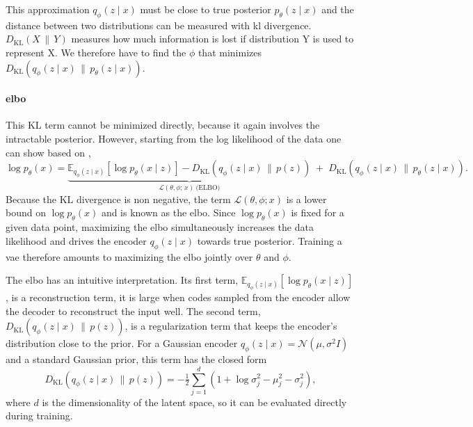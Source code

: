 \documentclass[
  numbers=noenddot,
  english,  %
  a4paper,  %
  twoside,  %
  bibliography=totoc,
  headsepline,
  cleardoublepage=empty,
  parskip=half,
  draft=false
]{scrbook}
\theoremstyle{break}
\begin{document}
This approximation $q_\phi(z \mid x)$ must be close to true posterior $p_\theta(z \mid x)$ and the distance between two distributions can be measured with \gls{kl} divergence. $D_{\mathrm{KL}} (X\,\|\,Y)$ measures how much information is lost if distribution Y is used to represent X. We therefore have to find the $\phi$ that minimizes $D_{\mathrm{KL}}\!\left(q_\phi(z \mid x)\,\|\,
p_\theta(z \mid x)\right)$.

\paragraph{\textbf{\gls{elbo}}}
This KL term cannot be minimized directly, because it again involves the intractable posterior. However, starting from the log likelihood of the data one can show based on \cite{c10},
%
\begin{equation}
	\log p_\theta(x) =
	\underbrace{\mathbb{E}_{q_\phi(z \mid x)}\!\left[\log p_\theta(x \mid z)\right]
		- D_{\mathrm{KL}}\!\left(q_\phi(z \mid x)\,\|\,p(z)\right)}_{\displaystyle \mathcal{L}(\theta, \phi;\, x)\ \text{(ELBO)}}
	\; + \; D_{\mathrm{KL}}\!\left(q_\phi(z \mid x)\,\|\,p_\theta(z \mid x)\right).
	\label{eq:elbo_decomp}
\end{equation}
%
Because the KL divergence is non negative, the term $\mathcal{L}(\theta, \phi; x)$ is a lower bound on $\log p_\theta(x)$ and is known as the \gls{elbo}. Since $\log p_\theta(x)$ is fixed for a given data point, maximizing the \gls{elbo} simultaneously increases the data likelihood and drives the encoder $q_\phi(z \mid x)$ towards true posterior. Training a \gls{vae} therefore amounts to maximizing the \gls{elbo} jointly over $\theta$ and $\phi$.

The \gls{elbo} has an intuitive interpretation. Its first term, $\mathbb{E}_{q_\phi(z \mid x)}[\log p_\theta(x \mid z)]$, is a reconstruction term, it is large when codes sampled from the encoder allow the decoder to
reconstruct the input well. The second term, $D_{\mathrm{KL}}(q_\phi(z \mid x)\,\|\,p(z))$, is a regularization term that keeps the encoder's distribution close to the prior. For a Gaussian encoder
$q_\phi(z \mid x) = \mathcal{N}(\mu, \sigma^2 I)$ and a standard Gaussian prior, this term has the closed form
%
\begin{equation}
	D_{\mathrm{KL}}\!\left(q_\phi(z \mid x)\,\|\,p(z)\right)
	= -\tfrac{1}{2} \sum_{j=1}^{d}
	\left(1 + \log \sigma_j^2 - \mu_j^2 - \sigma_j^2\right),
	\label{eq:kl_gaussian}
\end{equation}
%
where $d$ is the dimensionality of the latent space, so it can be evaluated
directly during training.
\end{document}
